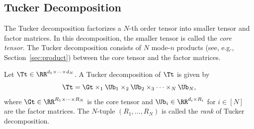 
\subsection{Tucker Decomposition}
The Tucker decomposition \cite{tucker1966some} factorizes a $N$-th order tensor
into smaller tensor and factor matrices. In this decomposition, the smaller
tensor is called the \emph{core tensor}. The Tucker
decomposition consists of $N$ mode-$n$ products (see, e.g., Section~\ref{sec:product})
between the core tensor and the factor matrices.

Let $\Tt \in \RR^{d_1 \times \dots \times d_N}$. A Tucker decomposition of $\Tt$
is given by
\[
    \Tt
    = \Gt \times_1 \Ub_1 \times_2 \Ub_2\times_3 \dots \times_N \Ub_N,
\]
where $\Gt \in \RR^{R_1 \times \dots \times R_N}$ is the core tensor and
$\Ub_i \in \RR^{d_i \times R_i}$ for $i \in [N]$ are the factor matrices.
The $N$-tuple $(R_1,\dots,R_N)$ is called the \emph{rank} of Tucker
decomposition.

